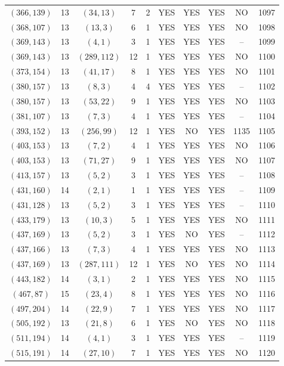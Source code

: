 \begin{longtable}{|c|c|c|c|c|c|c|c|c|c|}
$(366, 139)$ & 13 & $(34, 13)$ & 7 & 2 & YES & YES & YES & NO & 1097\\
$(368, 107)$ & 13 & $(13, 3)$ & 6 & 1 & YES & YES & YES & NO & 1098\\
$(369, 143)$ & 13 & $(4, 1)$ & 3 & 1 & YES & YES & YES & -- & 1099\\
$(369, 143)$ & 13 & $(289, 112)$ & 12 & 1 & YES & YES & YES & NO & 1100\\
$(373, 154)$ & 13 & $(41, 17)$ & 8 & 1 & YES & YES & YES & NO & 1101\\
$(380, 157)$ & 13 & $(8, 3)$ & 4 & 4 & YES & YES & YES & -- & 1102\\
$(380, 157)$ & 13 & $(53, 22)$ & 9 & 1 & YES & YES & YES & NO & 1103\\
$(381, 107)$ & 13 & $(7, 3)$ & 4 & 1 & YES & YES & YES & -- & 1104\\
$(393, 152)$ & 13 & $(256, 99)$ & 12 & 1 & YES & NO & YES & 1135 & 1105\\
$(403, 153)$ & 13 & $(7, 2)$ & 4 & 1 & YES & YES & YES & NO & 1106\\
$(403, 153)$ & 13 & $(71, 27)$ & 9 & 1 & YES & YES & YES & NO & 1107\\
$(413, 157)$ & 13 & $(5, 2)$ & 3 & 1 & YES & YES & YES & -- & 1108\\
$(431, 160)$ & 14 & $(2, 1)$ & 1 & 1 & YES & YES & YES & -- & 1109\\
$(431, 128)$ & 13 & $(5, 2)$ & 3 & 1 & YES & YES & YES & -- & 1110\\
$(433, 179)$ & 13 & $(10, 3)$ & 5 & 1 & YES & YES & YES & NO & 1111\\
$(437, 169)$ & 13 & $(5, 2)$ & 3 & 1 & YES & NO & YES & -- & 1112\\
$(437, 166)$ & 13 & $(7, 3)$ & 4 & 1 & YES & YES & YES & NO & 1113\\
$(437, 169)$ & 13 & $(287, 111)$ & 12 & 1 & YES & NO & YES & NO & 1114\\
$(443, 182)$ & 14 & $(3, 1)$ & 2 & 1 & YES & YES & YES & NO & 1115\\
$(467, 87)$ & 15 & $(23, 4)$ & 8 & 1 & YES & YES & YES & NO & 1116\\
$(497, 204)$ & 14 & $(22, 9)$ & 7 & 1 & YES & YES & YES & NO & 1117\\
$(505, 192)$ & 13 & $(21, 8)$ & 6 & 1 & YES & NO & YES & NO & 1118\\
$(511, 194)$ & 14 & $(4, 1)$ & 3 & 1 & YES & YES & YES & -- & 1119\\
$(515, 191)$ & 14 & $(27, 10)$ & 7 & 1 & YES & YES & YES & NO & 1120\\

\end{longtable}
